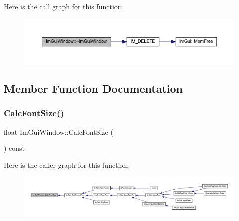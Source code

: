 Here is the call graph for this function\+:
\nopagebreak
\begin{figure}[H]
\begin{center}
\leavevmode
\includegraphics[width=350pt]{struct_im_gui_window_a8e81d730c3a39a71e6b6ca4654451c53_cgraph}
\end{center}
\end{figure}


\subsection{Member Function Documentation}
\mbox{\label{struct_im_gui_window_a6881ed65e208fb6e015d3ae6bccfc794}} 
\subsubsection{\texorpdfstring{Calc\+Font\+Size()}{CalcFontSize()}}
{\footnotesize\ttfamily float Im\+Gui\+Window\+::\+Calc\+Font\+Size (\begin{DoxyParamCaption}{ }\end{DoxyParamCaption}) const\hspace{0.3cm}{\ttfamily [inline]}}

Here is the caller graph for this function\+:
\nopagebreak
\begin{figure}[H]
\begin{center}
\leavevmode
\includegraphics[width=350pt]{struct_im_gui_window_a6881ed65e208fb6e015d3ae6bccfc794_icgraph}
\end{center}
\end{figure}
\mbox{\label{struct_im_gui_window_a66400a63bc0b54d7d29e08d1b1b1a42b}} 
